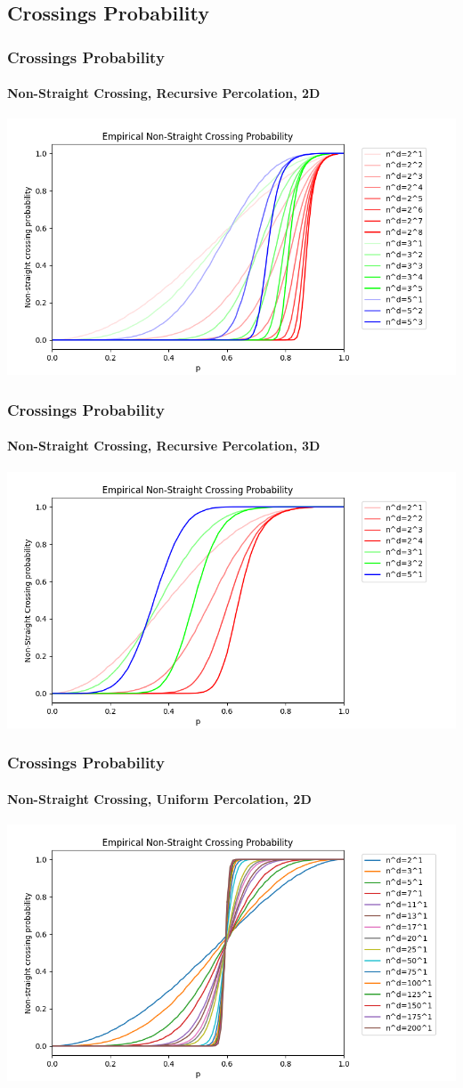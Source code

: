 \documentclass{beamer}
\begin{document}
	\subsection{Crossings Probability}
	\begin{frame}
		\frametitle{Crossings Probability}
		\framesubtitle{Non-Straight Crossing, Recursive Percolation, 2D}
		\includegraphics[scale=0.5]{imgs/crossing_proba_2D.png}
	\end{frame}
	\begin{frame}
		\frametitle{Crossings Probability}
		\framesubtitle{Non-Straight Crossing, Recursive Percolation, 3D}
		\includegraphics[scale=0.5]{imgs/crossing_proba_3D.png}
	\end{frame}
	\begin{frame}
		\frametitle{Crossings Probability}
		\framesubtitle{Non-Straight Crossing, Uniform Percolation, 2D}
		\includegraphics[scale=0.5]{imgs/crossing_proba_2D_ter.png}
	\end{frame}
\end{document}
